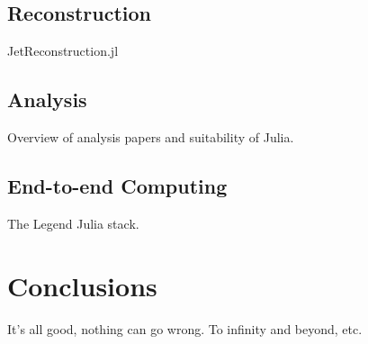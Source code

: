 \documentclass{webofc}
\begin{document}
\subsection{Reconstruction}

JetReconstruction.jl

\subsection{Analysis}

Overview of analysis papers and suitability of Julia.

\subsection{End-to-end Computing}

The Legend Julia stack.

\section{Conclusions}

It's all good, nothing can go wrong. To infinity and beyond, etc.

\sloppy
\raggedright

\end{document}
